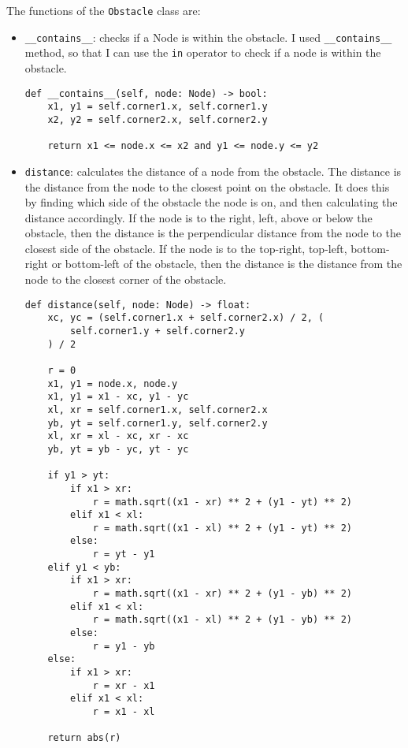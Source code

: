 \documentclass[12pt]{report}
\begin{document}
The functions of the \texttt{Obstacle} class are:
\begin{itemize}
    \item \texttt{\_\_contains\_\_}: checks if a Node is within the obstacle. I used \texttt{\_\_contains\_\_} method, so that I can use the \texttt{in} operator to check if a node is within the obstacle.
          \begin{lstlisting}[caption={\texttt{Obstacle.\_\_contains\_\_}}]
def __contains__(self, node: Node) -> bool:
    x1, y1 = self.corner1.x, self.corner1.y
    x2, y2 = self.corner2.x, self.corner2.y

    return x1 <= node.x <= x2 and y1 <= node.y <= y2
        \end{lstlisting}
    \item \texttt{distance}: calculates the distance of a node from the obstacle. The distance is the distance from the node to the closest point on the obstacle. It does this by finding which side of the obstacle the node is on, and then calculating the distance accordingly. If the node is to the right, left, above or below the obstacle, then the distance is the perpendicular distance from the node to the closest side of the obstacle. If the node is to the top-right, top-left, bottom-right or bottom-left of the obstacle, then the distance is the distance from the node to the closest corner of the obstacle.
          \begin{lstlisting}[caption={Obstacle.distance}]
def distance(self, node: Node) -> float:
    xc, yc = (self.corner1.x + self.corner2.x) / 2, (
        self.corner1.y + self.corner2.y
    ) / 2

    r = 0
    x1, y1 = node.x, node.y
    x1, y1 = x1 - xc, y1 - yc
    xl, xr = self.corner1.x, self.corner2.x
    yb, yt = self.corner1.y, self.corner2.y
    xl, xr = xl - xc, xr - xc
    yb, yt = yb - yc, yt - yc

    if y1 > yt:
        if x1 > xr:
            r = math.sqrt((x1 - xr) ** 2 + (y1 - yt) ** 2)
        elif x1 < xl:
            r = math.sqrt((x1 - xl) ** 2 + (y1 - yt) ** 2)
        else:
            r = yt - y1
    elif y1 < yb:
        if x1 > xr:
            r = math.sqrt((x1 - xr) ** 2 + (y1 - yb) ** 2)
        elif x1 < xl:
            r = math.sqrt((x1 - xl) ** 2 + (y1 - yb) ** 2)
        else:
            r = y1 - yb
    else:
        if x1 > xr:
            r = xr - x1
        elif x1 < xl:
            r = x1 - xl

    return abs(r)
        \end{lstlisting}
\end{itemize}
\end{document}
